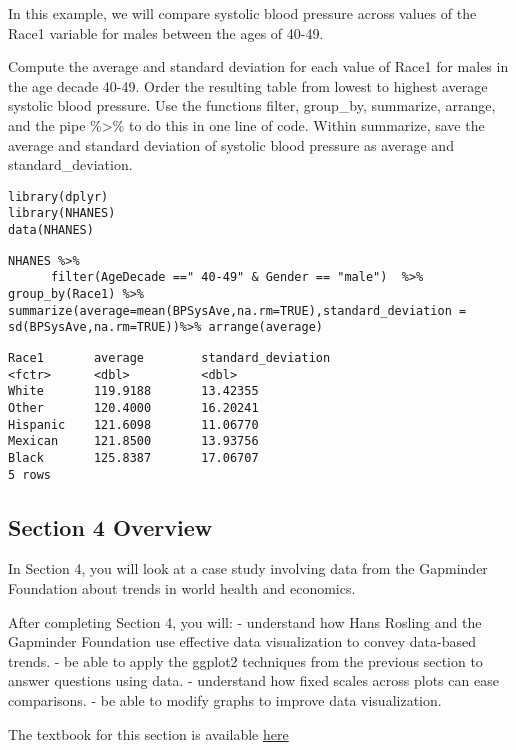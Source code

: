 \documentclass[]{article}
\begin{document}
In this example, we will compare systolic blood pressure across values
of the Race1 variable for males between the ages of 40-49.

Compute the average and standard deviation for each value of Race1 for
males in the age decade 40-49. Order the resulting table from lowest to
highest average systolic blood pressure. Use the functions filter,
group\_by, summarize, arrange, and the pipe \%\textgreater{}\% to do
this in one line of code. Within summarize, save the average and
standard deviation of systolic blood pressure as average and
standard\_deviation.

\begin{verbatim}
library(dplyr)
library(NHANES)
data(NHANES)
\end{verbatim}

\begin{verbatim}
NHANES %>%
      filter(AgeDecade ==" 40-49" & Gender == "male")  %>% group_by(Race1) %>% summarize(average=mean(BPSysAve,na.rm=TRUE),standard_deviation = sd(BPSysAve,na.rm=TRUE))%>% arrange(average)
\end{verbatim}

\begin{verbatim}
Race1       average        standard_deviation
<fctr>      <dbl>          <dbl>
White       119.9188       13.42355
Other       120.4000       16.20241
Hispanic    121.6098       11.06770
Mexican     121.8500       13.93756
Black       125.8387       17.06707
5 rows
\end{verbatim}

\hypertarget{section-4-overview}{%
\subsection{Section 4 Overview}\label{section-4-overview}}

In Section 4, you will look at a case study involving data from the
Gapminder Foundation about trends in world health and economics.

After completing Section 4, you will: - understand how Hans Rosling and
the Gapminder Foundation use effective data visualization to convey
data-based trends. - be able to apply the ggplot2 techniques from the
previous section to answer questions using data. - understand how fixed
scales across plots can ease comparisons. - be able to modify graphs to
improve data visualization.

The textbook for this section is available
\href{https://rafalab.github.io/dsbook/gapminder.html\#case-study-new-insights-on-poverty}{here}
\end{document}
